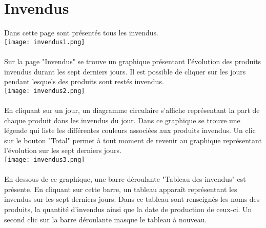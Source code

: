 \section{Invendus}
Dans cette page sont présentés tous les invendus.\\
\texttt{[image: invendus1.png]}
\paragraph{}
Sur la page "Invendus" se trouve un graphique présentant l'évolution des produits
invendus durant les sept derniers jours. Il est possible de cliquer sur les
jours pendant lesquels des produits sont restés invendus.\\
\texttt{[image: invendus2.png]}
\paragraph{}
En cliquant sur un jour, un diagramme circulaire s'affiche représentant la part de chaque produit dans les
invendus du jour. Dans ce graphique se trouve une légende qui liste les
différentes couleurs associées aux produits invendus. Un clic sur le bouton
"Total" permet à tout moment de revenir au graphique représentant l'évolution
sur les sept derniers jours.\\
\texttt{[image: invendus3.png]}
\paragraph{}
En dessous de ce graphique, une barre déroulante "Tableau des invendus" est
présente. En cliquant sur cette barre, un tableau apparaît représentant les
invendus sur les sept derniers jours. Dans ce tableau sont renseignés les noms
des produits, la quantité d'invendus ainsi que la date de production de ceux-ci.
Un second clic sur la barre déroulante masque le tableau à nouveau.
